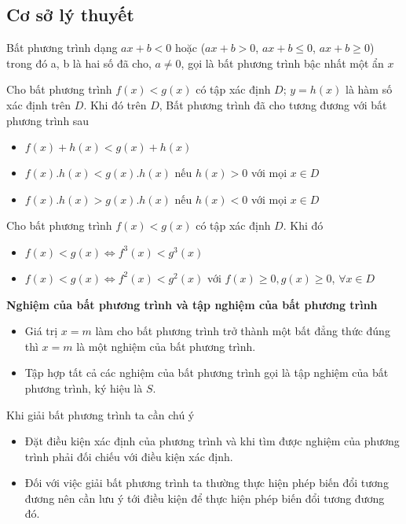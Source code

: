 \subsection{Cơ sở lý thuyết}
\begin{dn}
	Bất phương trình dạng $ax+b<0$ hoặc ($ax+b>0$, $ax+b\le 0$, $ax+b\ge 0$) trong đó a, b là hai số đã cho, $a\ne 0$, gọi là bất phương trình bậc nhất một ẩn $x$
\end{dn}
\begin{dl}
	Cho bất phương trình $f(x)<g(x)$ có tập xác định $ D$; $y=h(x)$ là hàm số xác định trên $ D$. Khi đó trên $ D$, Bất phương trình đã cho tương đương với bất phương trình sau 
	\begin{itemize}
		\item $f(x)+h(x)<g(x)+h(x)$
		\item $f(x).h(x)<g(x).h(x)$ nếu $h(x)>0$ với mọi $x\in D$
		\item $f(x).h(x)>g(x).h(x)$ nếu $h(x)<0$ với mọi $x\in D$
	\end{itemize}
\end{dl}
\begin{hq}
	Cho bất phương trình $f(x)<g(x)$ có tập xác định $D$. Khi đó
	\begin{itemize}
		\item $f(x)<g(x)\Leftrightarrow f^3(x)<g^3(x)$ 
		\item $f(x)<g(x)\Leftrightarrow f^2(x)<g^2(x)$ với $f(x)\ge 0,g(x)\ge 0$, $\forall x\in D$ 
	\end{itemize}
\end{hq}
\begin{note}
	\textbf{Nghiệm của bất phương trình và tập nghiệm của bất phương trình}
	\begin{itemize}
		\item Giá trị $x=m$ làm cho bất phương trình trở thành một bất đẳng thức đúng thì $x=m$ là một nghiệm của bất phương trình.
		\item Tập hợp tất cả các nghiệm của bất phương trình gọi là tập nghiệm của bất phương trình, ký hiệu là $ S $.
	\end{itemize}
\end{note}
\begin{note}
	Khi giải bất phương trình ta cần chú ý 
	\begin{itemize}
		\item Đặt điều kiện xác định của phương trình và khi tìm được nghiệm của phương trình phải đối chiếu với điều kiện xác định.
		\item Đối với việc giải bất phương trình ta thường thực hiện phép biến đổi tương đương nên cần lưu ý tới điều kiện để thực hiện phép biến đổi tương đương đó.
	\end{itemize}
\end{note}

